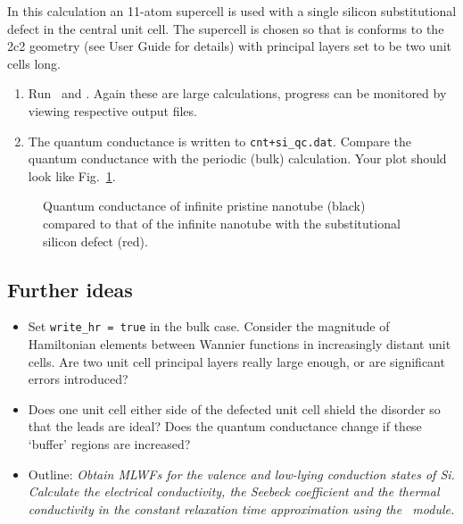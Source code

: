 \documentclass[a4paper,11pt,twoside]{article}
\begin{document}
In this calculation an 11-atom supercell is used with a single silicon
substitutional defect in the central unit cell. The supercell is
chosen so that is conforms to the 2c2 geometry (see User Guide for
details) with principal layers set to be two unit cells long.

\begin{enumerate}
\item Run \pwscf\ and \wannier. Again these are large calculations, progress
can be monitored by viewing respective output files.\\
\item The quantum conductance is written to {\tt cnt+si\_qc.dat}. 
Compare the quantum conductance with the periodic (bulk) calculation.
Your plot should look like Fig.~\ref{fig:cnt_qc}.

\end{enumerate}

\begin{figure}[h]
\begin{center}
\caption{Quantum conductance of infinite pristine nanotube (black) 
compared to that of the infinite nanotube with the substitutional silicon 
defect (red).}
\label{fig:cnt_qc}
\end{center}
\end{figure}

\subsection*{Further ideas}
\begin{itemize}
\item Set {\tt write\_hr = true} in the bulk case. Consider the magnitude of Hamiltonian 
	elements between Wannier functions in increasingly distant unit cells. Are two 
	unit cell principal layers really large enough, or are significant errors introduced?
\item Does one unit cell either side of the defected unit cell shield the disorder
	so that the leads are ideal? Does the quantum conductance change if these 
	`buffer' regions are increased?
\end{itemize}


\begin{itemize}
\item{Outline: \it{Obtain MLWFs for the valence and low-lying
    conduction states of Si. Calculate the electrical conductivity, the
    Seebeck coefficient and the thermal conductivity in the constant
    relaxation time approximation using the \bw\ module.}} 
\end{itemize}
\end{document}
